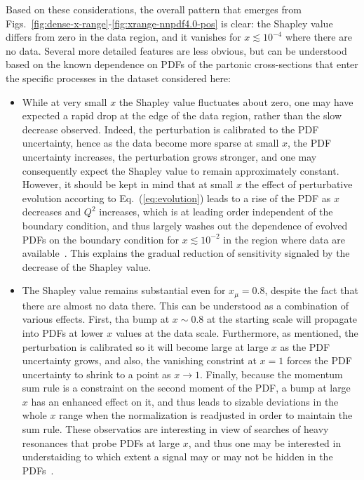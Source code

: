 \documentclass[11pt,a4paper]{article}
\begin{document}
Based on these considerations, the overall pattern that emerges from Figs.~\ref{fig:dense-x-range}-\ref{fig:xrange-nnpdf4.0-pos} is clear: the Shapley value differs from zero in the data region, and it vanishes for $x\lesssim 10^{-4}$ where there are no data. Several more detailed features are less obvious, but can be understood based on the known dependence on PDFs of the partonic cross-sections that enter the specific processes in the dataset considered here:
\begin{itemize}
    \item While at very small $x$ the Shapley value fluctuates about zero, one may have expected a rapid drop at the edge of the data region, rather than the slow decrease observed. Indeed, the perturbation is calibrated to the PDF uncertainty, hence as the data become more sparse at small $x$, the PDF uncertainty increases, the  perturbation grows stronger, and one may consequently expect the Shapley value to remain approximately constant. However, it should be kept in mind that at small $x$ the effect of perturbative evolution accorting to Eq.~(\ref{eq:evolution}) leads to a rise of the PDF as $x$ decreases and $Q^2$ increases, which is at leading order independent of the boundary condition, and thus largely washes out the dependence of evolved PDFs on the boundary condition for $x\lesssim 10^{-2}$ in the region where data are available~\cite{Ball:1994du}. This explains the gradual reduction of sensitivity signaled by the decrease of the Shapley value.
    \item The Shapley value remains substantial even for $x_\mu=0.8$, despite the fact that there are almost no data there. This can be understood as a combination of  various effects. First, tha bump at $x\sim 0.8$ at the starting scale  will propagate into PDFs at lower $x$ values at the data scale. Furthermore, as mentioned, the perturbation is calibrated so it will become large at large $x$ as the PDF uncertainty grows, and also, the vanishing constrint at $x=1$ forces the PDF uncertainty to shrink to a point as $x\to1$. Finally, because the momentum sum rule is a constraint on the second moment of the PDF, a bump at large $x$ has an enhanced effect on it, and thus leads to sizable deviations in the  whole $x$ range when the normalization is readjusted in order to maintain the sum rule. These observatios are interesting in view of searches of heavy resonances that probe PDFs at large $x$, and thus one may be interested in understaiding to which extent a signal may or may not be hidden in the PDFs~\cite{Carrazza:2019sec}.

\end{itemize}
\end{document}
